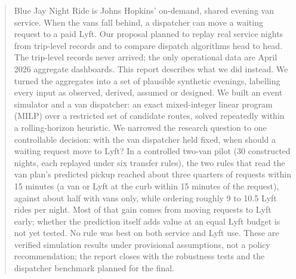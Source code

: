 \documentclass{article}
\begin{document}


\begin{abstract}
Blue Jay Night Ride is Johns Hopkins' on-demand, shared evening van service. When the vans fall behind, a dispatcher can move a waiting request to a paid Lyft. Our proposal planned to replay real service nights from trip-level records and to compare dispatch algorithms head to head. The trip-level records never arrived; the only operational data are April 2026 aggregate dashboards. This report describes what we did instead. We turned the aggregates into a set of plausible synthetic evenings, labelling every input as observed, derived, assumed or designed. We built an event simulator and a van dispatcher: an exact mixed-integer linear program (MILP) over a restricted set of candidate routes, solved repeatedly within a rolling-horizon heuristic. We narrowed the research question to one controllable decision: with the van dispatcher held fixed, when should a waiting request move to Lyft? In a controlled two-van pilot (30 constructed nights, each replayed under six transfer rules), the two rules that read the van plan's predicted pickup reached about three quarters of requests within 15 minutes (a van or Lyft at the curb within 15 minutes of the request), against about half with vans only, while ordering roughly 9 to 10.5 Lyft rides per night. Most of that gain comes from moving requests to Lyft early; whether the prediction itself adds value at an equal Lyft budget is not yet tested. No rule was best on both service and Lyft use. These are verified simulation results under provisional assumptions, not a policy recommendation; the report closes with the robustness tests and the dispatcher benchmark planned for the final.
\end{abstract}
\end{document}
